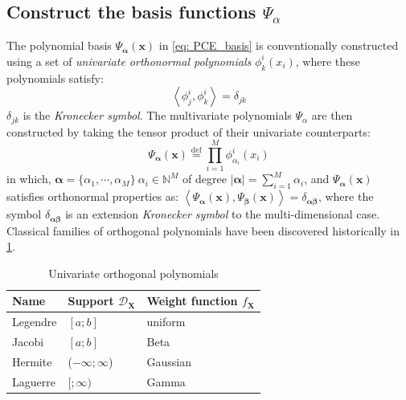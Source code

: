 \subsection{Construct the basis functions $\Psi_{\alpha}$}
The polynomial basis $\Psi_{\boldsymbol{\alpha}}(\boldsymbol{x})$ in \cref{eq: PCE_basis} is conventionally constructed using a set of \textit{univariate orthonormal polynomials} $\phi_{k}^{i}(x_{i})$, where these polynomials satisfy:
\begin{equation}
    \left \langle 
\phi_{j}^{i},\phi_{k}^{i}
 \right \rangle 
= \delta_{jk}
\end{equation}
$\delta_{jk}$ is the \textit{Kronecker symbol}. The multivariate polynomials $\Psi_{\alpha}$ are then constructed by taking the tensor product of their univariate counterparts:
\begin{equation}
\Psi_{\boldsymbol{\alpha}}(\boldsymbol{x})
 \overset{\mathrm{def}}{=}
\prod_{i=1}^{M} 
\phi_{\alpha_{i}}^{i}(x_{i})
\end{equation}
in which, $\boldsymbol{\alpha}= \{\alpha_{1},\cdots,\alpha_{M}\}  \ \alpha_{i} \in \mathbb{N}^{M}$ of degree $|\boldsymbol{\alpha }|=\sum_{i=1}^{M} \alpha_{i}$, and $\Psi_{\boldsymbol{\alpha}}(\boldsymbol{x})$ satisfies orthonormal properties as:
$        \left \langle 
\Psi_{\boldsymbol{\alpha}}(\boldsymbol{x}),\Psi_{\boldsymbol{\beta}}(\boldsymbol{x})
 \right \rangle 
= \delta_{\boldsymbol{\alpha}\boldsymbol{\beta}}$, where the symbol $\delta_{\boldsymbol{\alpha}\boldsymbol{\beta}}$ is an extension \textit{Kronecker symbol} to the multi-dimensional case. Classical families of orthogonal polynomials have been discovered historically in \cref{table: Polynomial_family}. 
\begin{table}[]
\caption{Univariate orthogonal polynomials}
\label{table: Polynomial_family}
\centering
\begin{tabular}{lll}
\hline
\textbf{Name}& \textbf{Support $\mathcal{D}_{\boldsymbol{X}}$}& \textbf{Weight function $f_{\boldsymbol{X}}$}\\ \hline
Legendre&            $[a;b]$&                    uniform\\
Jacobi&            $[a;b]$&                    Beta\\
Hermite&            ($-\infty;\infty$)&                    Gaussian\\
Laguerre&            $[;\infty)$&                    Gamma\\ \hline
\end{tabular}
\end{table}
